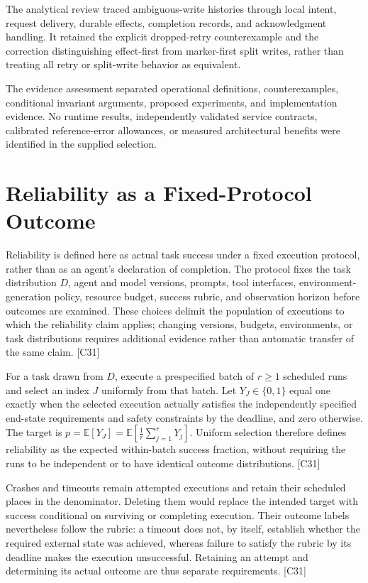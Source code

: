 \documentclass[11pt]{article}
\begin{document}
The analytical review traced ambiguous-write histories through local intent, request delivery, durable effects, completion records, and acknowledgment handling. It retained the explicit dropped-retry counterexample and the correction distinguishing effect-first from marker-first split writes, rather than treating all retry or split-write behavior as equivalent.

The evidence assessment separated operational definitions, counterexamples, conditional invariant arguments, proposed experiments, and implementation evidence. No runtime results, independently validated service contracts, calibrated reference-error allowances, or measured architectural benefits were identified in the supplied selection.

\section{Reliability as a Fixed-Protocol Outcome}
Reliability is defined here as actual task success under a fixed execution protocol, rather than as an agent\textquoteright{}s declaration of completion. The protocol fixes the task distribution $D$, agent and model versions, prompts, tool interfaces, environment-generation policy, resource budget, success rubric, and observation horizon before outcomes are examined. These choices delimit the population of executions to which the reliability claim applies; changing versions, budgets, environments, or task distributions requires additional evidence rather than automatic transfer of the same claim. [C31]

For a task drawn from $D$, execute a prespecified batch of $r\geq 1$ scheduled runs and select an index $J$ uniformly from that batch. Let $Y_J\in\{0,1\}$ equal one exactly when the selected execution actually satisfies the independently specified end-state requirements and safety constraints by the deadline, and zero otherwise. The target is $p=\mathbb{E}[Y_J]=\mathbb{E}\!\left[\frac{1}{r}\sum_{j=1}^{r}Y_j\right]$. Uniform selection therefore defines reliability as the expected within-batch success fraction, without requiring the runs to be independent or to have identical outcome distributions. [C31]

Crashes and timeouts remain attempted executions and retain their scheduled places in the denominator. Deleting them would replace the intended target with success conditional on surviving or completing execution. Their outcome labels nevertheless follow the rubric: a timeout does not, by itself, establish whether the required external state was achieved, whereas failure to satisfy the rubric by its deadline makes the execution unsuccessful. Retaining an attempt and determining its actual outcome are thus separate requirements. [C31]
\end{document}
